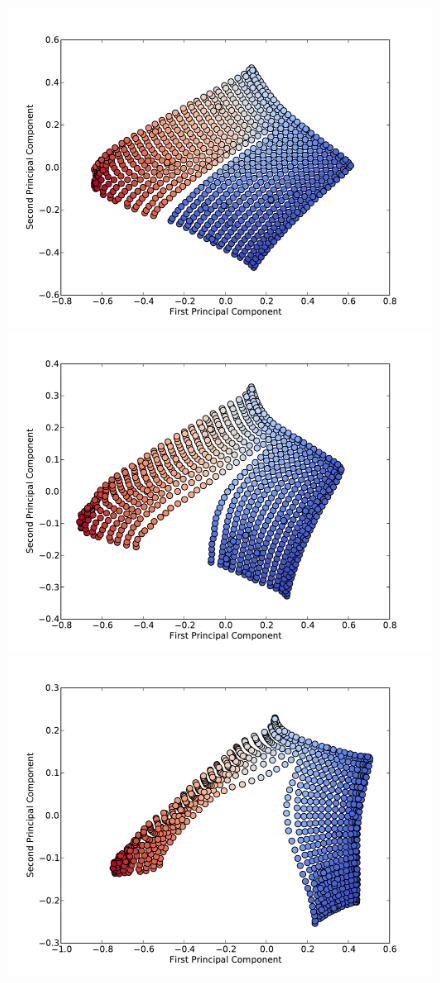 \documentclass{article} %
\begin{document}
\begin{figure}[!htb]
    \includegraphics[width=\linewidth]{../writeup/figs/chap4/2rmop1.pdf}
  \endminipage\hfill
    \includegraphics[width=\linewidth]{../writeup/figs/chap4/2rmop2.pdf}
  \endminipage
    \includegraphics[width=\linewidth]{../writeup/figs/chap4/2rmop3.pdf}

\end{figure}
\end{document}
